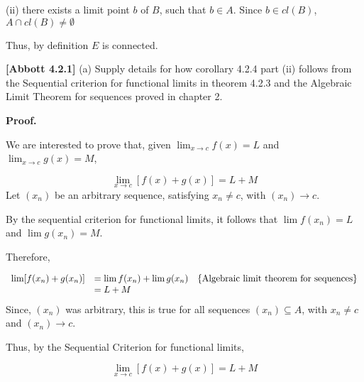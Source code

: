 \documentclass[10pt]{article}
\begin{document}
(ii) there exists a limit point $\displaystyle b$ of $\displaystyle B$, such that $\displaystyle b\in A$. Since $\displaystyle b\in cl( B)$, $\displaystyle A\cap cl( B) \neq \emptyset $



Thus, by definition $\displaystyle E$ is connected.



\textbf{[Abbott 4.2.1]}$ $\textbf{ }(a) Supply details for how corollary 4.2.4 part (ii) follows from the Sequential criterion for functional limits in theorem 4.2.3 and the Algebraic Limit Theorem for sequences proved in chapter 2.



\textbf{Proof.}



We are interested to prove that, given $\displaystyle \lim _{x\rightarrow c} f( x) =L$ and $\displaystyle \lim _{x\rightarrow c} g( x) =M$, 


\begin{equation*}
\lim _{x\rightarrow c}[ f( x) +g( x)] =L+M
\end{equation*}
Let $\displaystyle ( x_{n})$ be an arbitrary sequence, satisfying $\displaystyle x_{n} \neq c$, with $\displaystyle ( x_{n})\rightarrow c$. 



By the sequential criterion for functional limits, it follows that $\displaystyle \lim f( x_{n}) =L$ and $\displaystyle \lim g( x_{n}) =M$.



Therefore,


\begin{equation*}
\begin{array}{ c l c }
\lim [ f( x_{n}) +g( x_{n})] & =\lim f( x_{n}) +\lim g( x_{n}) & \left\{\text{Algebraic limit theorem for sequences}\right\}\\
 & =L+M & 
\end{array}
\end{equation*}
Since, $\displaystyle ( x_{n})$ was arbitrary, this is true for all sequences $\displaystyle ( x_{n}) \subseteq A$, with $\displaystyle x_{n} \neq c$ and $\displaystyle ( x_{n})\rightarrow c$.



Thus, by the Sequential Criterion for functional limits,


\begin{equation*}
\lim _{x\rightarrow c}[ f( x) +g( x)] =L+M
\end{equation*}
\end{document}
